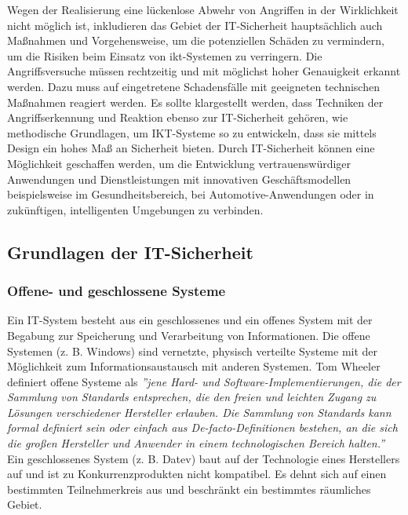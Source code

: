 Wegen der Realisierung eine lückenlose Abwehr von Angriffen in der Wirklichkeit nicht möglich ist, inkludieren das Gebiet der IT-Sicherheit hauptsächlich auch Maßnahmen und Vorgehensweise, um die potenziellen Schäden zu vermindern, um die Risiken beim Einsatz von \gls{ikt}-Systemen zu verringern. Die Angriffsversuche müssen rechtzeitig und mit möglichst hoher Genauigkeit erkannt werden. Dazu muss auf eingetretene Schadensfälle mit geeigneten technischen Maßnahmen reagiert werden. Es sollte klargestellt werden, dass Techniken der Angriffserkennung und Reaktion ebenso zur IT-Sicherheit gehören, wie methodische Grundlagen, um IKT-Systeme so zu entwickeln, dass sie mittels Design ein hohes Maß an Sicherheit bieten. Durch IT-Sicherheit können eine Möglichkeit geschaffen werden, um die Entwicklung vertrauenswürdiger Anwendungen und Dienstleistungen mit innovativen Geschäftsmodellen beispielsweise im Gesundheitsbereich, bei Automotive-Anwendungen oder in zukünftigen, intelligenten Umgebungen zu verbinden\cite[20--21]{eckert2013sicherheit}.

\subsection{Grundlagen der IT-Sicherheit}



\subsubsection{Offene- und geschlossene Systeme}

Ein IT-System besteht aus ein geschlossenes und ein offenes System mit der Begabung zur Speicherung und Verarbeitung von Informationen. Die offene Systemen (z. B. Windows) sind vernetzte, physisch verteilte Systeme mit der Möglichkeit zum Informationsaustausch mit anderen Systemen\cite[22--23]{eckert2013sicherheit}. Tom Wheeler definiert offene Systeme als \emph{''jene Hard- und Software-Implementierungen, die der Sammlung von Standards entsprechen, die den freien und leichten Zugang zu Lösungen verschiedener Hersteller erlauben. Die Sammlung von Standards kann formal definiert sein oder einfach aus De-facto-Definitionen bestehen, an die sich die großen Hersteller und Anwender in einem technologischen Bereich halten.''}\cite[4]{wheeler2013offene} Ein geschlossenes System (z. B. Datev) baut auf der Technologie eines Herstellers auf und ist zu Konkurrenzprodukten nicht kompatibel.  Es dehnt sich auf einen bestimmten Teilnehmerkreis aus und beschränkt ein bestimmtes räumliches Gebiet\cite[22--23]{eckert2013sicherheit}.

